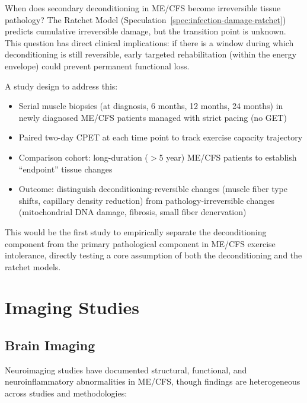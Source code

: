 \begin{open_question}
\label{oq:deconditioning-pathology-transition}
When does secondary deconditioning in ME/CFS become irreversible tissue pathology? The Ratchet Model (Speculation~\ref{spec:infection-damage-ratchet}) predicts cumulative irreversible damage, but the transition point is unknown. This question has direct clinical implications: if there is a window during which deconditioning is still reversible, early targeted rehabilitation (within the energy envelope) could prevent permanent functional loss.

A study design to address this:
\begin{itemize}
    \item Serial muscle biopsies (at diagnosis, 6 months, 12 months, 24 months) in newly diagnosed ME/CFS patients managed with strict pacing (no GET)
    \item Paired two-day CPET at each time point to track exercise capacity trajectory
    \item Comparison cohort: long-duration ($>$5 year) ME/CFS patients to establish ``endpoint'' tissue changes
    \item Outcome: distinguish deconditioning-reversible changes (muscle fiber type shifts, capillary density reduction) from pathology-irreversible changes (mitochondrial DNA damage, fibrosis, small fiber denervation)
\end{itemize}

This would be the first study to empirically separate the deconditioning component from the primary pathological component in ME/CFS exercise intolerance, directly testing a core assumption of both the deconditioning and the ratchet models.
\end{open_question}

\section{Imaging Studies}
\label{sec:imaging-studies}

\subsection{Brain Imaging}

Neuroimaging studies have documented structural, functional, and neuroinflammatory abnormalities in ME/CFS, though findings are heterogeneous across studies and methodologies:

